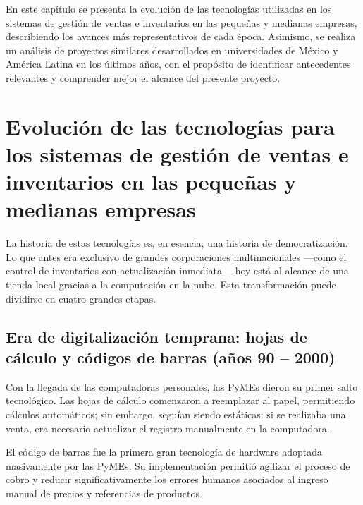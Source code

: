 
\clearpage
{}
\setcounter{page}{11}

En este capítulo se presenta la evolución de las tecnologías utilizadas en los sistemas de gestión de ventas e inventarios en las pequeñas y medianas empresas, describiendo los avances más representativos de cada época. Asimismo, se realiza un análisis de proyectos similares desarrollados en universidades de México y América Latina en los últimos años, con el propósito de identificar antecedentes relevantes y comprender mejor el alcance del presente proyecto.



\section{Evolución de las tecnologías para los sistemas de gestión de ventas e inventarios en las pequeñas y medianas empresas}

La historia de estas tecnologías es, en esencia, una historia de democratización. Lo que antes era exclusivo de grandes corporaciones multinacionales ---como el control de inventarios con actualización inmediata--- hoy está al alcance de una tienda local gracias a la computación en la nube. Esta transformación puede dividirse en cuatro grandes etapas.

\subsection{Era de digitalización temprana: hojas de cálculo y códigos de barras (años 90 -- 2000)}

Con la llegada de las computadoras personales, las PyMEs dieron su primer salto tecnológico. Las hojas de cálculo comenzaron a reemplazar al papel, permitiendo cálculos automáticos; sin embargo, seguían siendo estáticas: si se realizaba una venta, era necesario actualizar el registro manualmente en la computadora.

El código de barras fue la primera gran tecnología de hardware adoptada masivamente por las PyMEs. Su implementación permitió agilizar el proceso de cobro y reducir significativamente los errores humanos asociados al ingreso manual de precios y referencias de productos.

